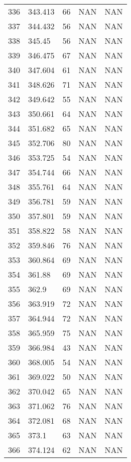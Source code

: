 \documentclass{article}
\begin{document}
\begin{longtable}{@{}lllll@{}}
				336 & 343.413 & 66    & NAN   & NAN   \\
				337 & 344.432 & 56    & NAN   & NAN   \\
				338 & 345.45  & 56    & NAN   & NAN   \\
				339 & 346.475 & 67    & NAN   & NAN   \\
				340 & 347.604 & 61    & NAN   & NAN   \\
				341 & 348.626 & 71    & NAN   & NAN   \\
				342 & 349.642 & 55    & NAN   & NAN   \\
				343 & 350.661 & 64    & NAN   & NAN   \\
				344 & 351.682 & 65    & NAN   & NAN   \\
				345 & 352.706 & 80    & NAN   & NAN   \\
				346 & 353.725 & 54    & NAN   & NAN   \\
				347 & 354.744 & 66    & NAN   & NAN   \\
				348 & 355.761 & 64    & NAN   & NAN   \\
				349 & 356.781 & 59    & NAN   & NAN   \\
				350 & 357.801 & 59    & NAN   & NAN   \\
				351 & 358.822 & 58    & NAN   & NAN   \\
				352 & 359.846 & 76    & NAN   & NAN   \\
				353 & 360.864 & 69    & NAN   & NAN   \\
				354 & 361.88  & 69    & NAN   & NAN   \\
				355 & 362.9   & 69    & NAN   & NAN   \\
				356 & 363.919 & 72    & NAN   & NAN   \\
				357 & 364.944 & 72    & NAN   & NAN   \\
				358 & 365.959 & 75    & NAN   & NAN   \\
				359 & 366.984 & 43    & NAN   & NAN   \\
				360 & 368.005 & 54    & NAN   & NAN   \\
				361 & 369.022 & 50    & NAN   & NAN   \\
				362 & 370.042 & 65    & NAN   & NAN   \\
				363 & 371.062 & 76    & NAN   & NAN   \\
				364 & 372.081 & 68    & NAN   & NAN   \\
				365 & 373.1   & 63    & NAN   & NAN   \\
				366 & 374.124 & 62    & NAN   & NAN   \\

\end{longtable}
\end{document}
